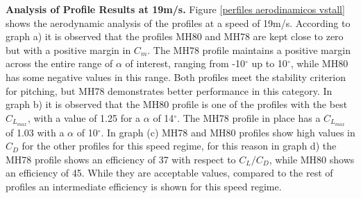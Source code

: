 \textbf{Analysis of Profile Results at 19m/s.} Figure \ref{perfiles aerodinamicos vstall} shows the aerodynamic analysis of the profiles at a speed of 19m/s. According to graph a) it is observed that the profiles MH80 and MH78 are kept close to zero but with a positive margin in $C_m$. The MH78 profile maintains a positive margin across the entire range of $\alpha$ of interest, ranging from -10$^\circ$ up to 10$^\circ$, while MH80 has some negative values in this range. Both profiles meet the stability criterion for pitching, but MH78 demonstrates better performance in this category. In graph b) it is observed that the MH80 profile is one of the profiles with the best $C_{L_{max}}$, with a value of 1.25 for a $\alpha$ of 14$^\circ$. The MH78 profile in place has a $C_{L_{max}}$ of 1.03 with a $\alpha$ of 10$^\circ$. In graph (c) MH78 and MH80 profiles show high values in $C_D$ for the other profiles for this speed regime, for this reason in graph d) the MH78 profile shows an efficiency of 37 with respect to $C_L/C_D$, while MH80 shows an efficiency of 45. While they are acceptable values, compared to the rest of profiles an intermediate efficiency is shown for this speed regime.  

